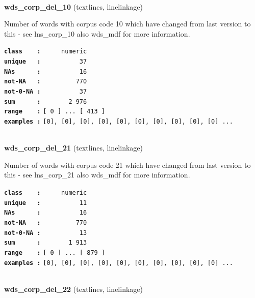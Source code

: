 \documentclass[]{article}
\begin{document}
~

\textbf{wds\_corp\_del\_10} (textlines, linelinkage)

Number of words with corpus code 10 which have changed from last version
to this - see lns\_corp\_10 also wds\_mdf for more information.

\textbf{\texttt{class\ \ \ \ :}} \texttt{~~~~~numeric}\\
\textbf{\texttt{unique\ \ \ :}} \texttt{~~~~~~~~~~37}\\
\textbf{\texttt{NAs\ \ \ \ \ \ :}} \texttt{~~~~~~~~~~16}\\
\textbf{\texttt{not-NA\ \ \ :}} \texttt{~~~~~~~~~770}\\
\textbf{\texttt{not-0-NA\ :}} \texttt{~~~~~~~~~~37}\\
\textbf{\texttt{sum\ \ \ \ \ \ :}} \texttt{~~~~~~~2~976}\\
\textbf{\texttt{range\ \ \ \ :}}
\texttt{{[}\ 0\ {]}\ ...\ {[}\ 413\ {]}}\\
\textbf{\texttt{examples\ :}}
\texttt{{[}0{]},\ {[}0{]},\ {[}0{]},\ {[}0{]},\ {[}0{]},\ {[}0{]},\ {[}0{]},\ {[}0{]},\ {[}0{]},\ {[}0{]}\ ...}\\

~

\textbf{wds\_corp\_del\_21} (textlines, linelinkage)

Number of words with corpus code 21 which have changed from last version
to this - see lns\_corp\_21 also wds\_mdf for more information.

\textbf{\texttt{class\ \ \ \ :}} \texttt{~~~~~numeric}\\
\textbf{\texttt{unique\ \ \ :}} \texttt{~~~~~~~~~~11}\\
\textbf{\texttt{NAs\ \ \ \ \ \ :}} \texttt{~~~~~~~~~~16}\\
\textbf{\texttt{not-NA\ \ \ :}} \texttt{~~~~~~~~~770}\\
\textbf{\texttt{not-0-NA\ :}} \texttt{~~~~~~~~~~13}\\
\textbf{\texttt{sum\ \ \ \ \ \ :}} \texttt{~~~~~~~1~913}\\
\textbf{\texttt{range\ \ \ \ :}}
\texttt{{[}\ 0\ {]}\ ...\ {[}\ 879\ {]}}\\
\textbf{\texttt{examples\ :}}
\texttt{{[}0{]},\ {[}0{]},\ {[}0{]},\ {[}0{]},\ {[}0{]},\ {[}0{]},\ {[}0{]},\ {[}0{]},\ {[}0{]},\ {[}0{]}\ ...}\\

~

\textbf{wds\_corp\_del\_22} (textlines, linelinkage)
\end{document}
